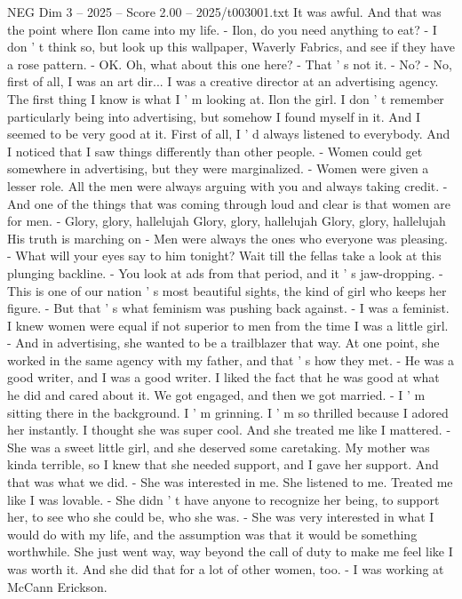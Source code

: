 \begin{textsample}{NEG Dim 3 – 2025 – Score 2.00 – 2025/t003001.txt}
It was awful.
And that was the point where Ilon came into my life. - Ilon, do you need anything to eat? - I don ' t think so, but look up this wallpaper, Waverly Fabrics, and see if they have a rose pattern. - OK.
Oh, what about this one here? - That ' s not it. - No? - No, first of all, I was an art dir...
I was a creative director at an advertising agency.
The first thing I know is what I ' m looking at.
Ilon the girl.
I don ' t remember particularly being into advertising, but somehow I found myself in it.
And I seemed to be very good at it.
First of all, I ' d always listened to everybody.
And I noticed that I saw things differently than other people. - Women could get somewhere in advertising, but they were marginalized. - Women were given a lesser role.
All the men were always arguing with you and always taking credit. - And one of the things that was coming through loud and clear is that women are for men. - Glory, glory, hallelujah Glory, glory, hallelujah Glory, glory, hallelujah His truth is marching on - Men were always the ones who everyone was pleasing. - What will your eyes say to him tonight?
Wait till the fellas take a look at this plunging backline. - You look at ads from that period, and it ' s jaw-dropping. - This is one of our nation ' s most beautiful sights, the kind of girl who keeps her figure. - But that ' s what feminism was pushing back against. - I was a feminist.
I knew women were equal if not superior to men from the time I was a little girl. - And in advertising, she wanted to be a trailblazer that way.
At one point, she worked in the same agency with my father, and that ' s how they met. - He was a good writer, and I was a good writer.
I liked the fact that he was good at what he did and cared about it.
We got engaged, and then we got married. - I ' m sitting there in the background.
I ' m grinning.
I ' m so thrilled because I adored her instantly.
I thought she was super cool.
And she treated me like I mattered. - She was a sweet little girl, and she deserved some caretaking.
My mother was kinda terrible, so I knew that she needed support, and I gave her support.
And that was what we did. - She was interested in me.
She listened to me.
Treated me like I was lovable. - She didn ' t have anyone to recognize her being, to support her, to see who she could be, who she was. - She was very interested in what I would do with my life, and the assumption was that it would be something worthwhile.
She just went way, way beyond the call of duty to make me feel like I was worth it.
And she did that for a lot of other women, too. - I was working at McCann Erickson.

\end{textsample}
